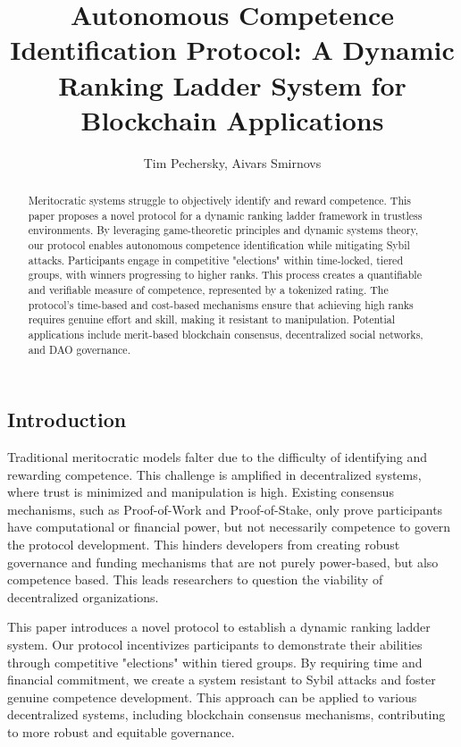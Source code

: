 \documentclass{article}
\title{Autonomous Competence Identification Protocol: A Dynamic Ranking Ladder System for Blockchain Applications}
\author{Tim Pechersky, Aivars Smirnovs}
\begin{document}
\begin{CJK}{UTF8}{gbsn}

    \maketitle

    \begin{abstract}
        Meritocratic systems struggle to objectively identify and reward competence. This paper proposes a novel protocol for a dynamic ranking ladder framework in trustless environments. By leveraging game-theoretic principles and dynamic systems theory, our protocol enables autonomous competence identification while mitigating Sybil attacks. Participants engage in competitive "elections" within time-locked, tiered groups, with winners progressing to higher ranks. This process creates a quantifiable and verifiable measure of competence, represented by a tokenized rating. The protocol's time-based and cost-based mechanisms ensure that achieving high ranks requires genuine effort and skill, making it resistant to manipulation. Potential applications include merit-based blockchain consensus, decentralized social networks, and DAO governance.
    \end{abstract}

    \section{Introduction}

    Traditional meritocratic models falter due to the difficulty of identifying and rewarding competence.\cite{Arrow2000} This challenge is amplified in decentralized systems, where trust is minimized and manipulation is high. Existing consensus mechanisms, such as Proof-of-Work and Proof-of-Stake, only prove participants have computational or financial power, but not necessarily competence to govern the protocol development. This hinders developers from creating robust governance and funding mechanisms that are not purely power-based, but also competence based.\cite{Rainer2023}\cite{Robin22} This leads researchers to question the viability of decentralized organizations.\cite{Xuan2024}

    This paper introduces a novel protocol to establish a dynamic ranking ladder system. Our protocol incentivizes participants to demonstrate their abilities through competitive "elections" within tiered groups. By requiring time and financial commitment, we create a system resistant to Sybil attacks and foster genuine competence development. This approach can be applied to various decentralized systems, including blockchain consensus mechanisms, contributing to more robust and equitable governance.


\end{CJK}
\end{document}
